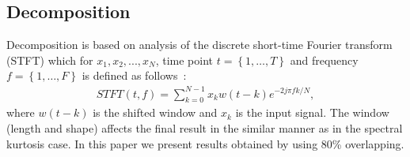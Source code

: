 \documentclass[11pt]{article} %
\begin{document}
\subsection{Decomposition}\label{decomposition}
Decomposition is based on analysis of the discrete short-time Fourier transform (STFT) which for $x_1,x_2,...,x_N$, time point $t= \left\{1,\ldots,T\right\}$ and frequency $f= \left\{1,\ldots,F\right\}$ is defined as follows~\cite{allen}:
\begin{eqnarray}
STFT(t,f)=\sum_{k=0}^{N-1}x_k w(t-k)e^{-2j\pi f k/N},
\label{stft-discr}\end{eqnarray}
where $w(t-k)$ is the shifted window and $x_k$ is the input signal. The window (length and shape) affects the final result in the similar manner as in the spectral kurtosis case. In this paper we present results obtained by using 80\% overlapping.
\end{document}
